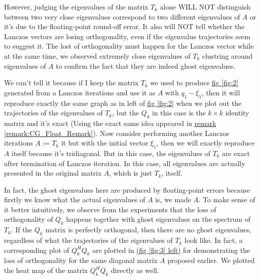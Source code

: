 \documentclass[]{article}
\theoremstyle{definition}
\begin{document}
            \par
            However, judging the eigenvalues of the matrix $T_k$ alone WILL NOT distinguish between two very close eigenvalues correspond to two different eigenvalues of $A$ or it's due to the floating-point round-off error. It also will NOT tell whether the Lanczos vectors are losing orthogonality, even if the eigenvalue trajectories seem to suggest it. The lost of orthogonality must happen for the Lanczos vector while at the same time, we observed extremely close eigenvalues of $T_k$ clustring around eigenvalues of $A$ to confirm the fact that they are indeed ghost eigenvalues. 
            \par
            We can't tell it because if I keep the matrix $T_k$ we used to  produce \hyperref[fig:2]{fig \ref*{fig:2}} generated from a Lanczos iterations and use it as $A$ with $q_1 - \xi_1$, then it will reproduce exactly the same graph as in left of \hyperref[fig:2]{fig \ref*{fig:2}} when we plot out the trajectories of the eigenvalues of $T_k$, but the $Q_k$ in this case is the $k\times k$ identity matrix and it's exact (Using the exact same idea appeared in \hyperref[remark:CG_Float_Remark]{remark \ref*{remark:CG_Float_Remark}}). Now consider performing another Lanczos iterations $A:=T_k$ it but with the initial vector $\xi_1$, then we will exactly reproduce $A$ itself because it's tridiagonal. But in this case, the eigenvalues of $T_k$ are exact after termination of Lanczos iteration. In this case, all eigenvalues are actually presented in the original matrix $A$, which is just $T_k$, itself. 
            \par
            In fact, the ghost eigenvalues here are produced by floating-point errors because firstly we know what the actual eigenvalues of $A$ is, we made $A$. To make sense of it better intuitively, we observe from the experiments that the loss of orthogonality of $Q_k$ happens together with ghost eigenvalues on the spectrum of $T_k$. If the $Q_k$ matrix is perfectly orthogonal, then there are no ghost eigenvalues, regardless of what the trajectories of the eigenvalues of $T_k$ look like. In fact, a corresponding plot of $Q_k^HQ_k$ are plotted in \hyperref[fig:3]{(fig \ref*{fig:3} left)} for demonstrating the loss of orthogonality for the same diagonal matrix $A$ proposed earlier. We plotted the heat map of the matrix $Q^H_kQ_k$ directly as well.
\end{document}
